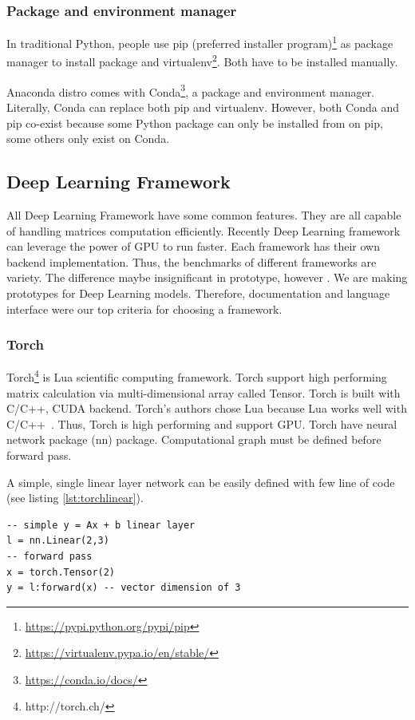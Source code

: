 \subsubsection{Package and environment manager}
In traditional Python, people use pip (preferred installer program)\footnote{\url{https://pypi.python.org/pypi/pip}} as package manager to install package and virtualenv\footnote{\url{https://virtualenv.pypa.io/en/stable/}}. Both have to be installed manually.

Anaconda distro comes with Conda\footnote{\url{https://conda.io/docs/}}, a package and environment manager.
Literally, Conda can replace both pip and virtualenv.
However, both Conda and pip co-exist because some Python package can only be installed from on pip, some others only exist on Conda.


\subsection{Deep Learning Framework}
All Deep Learning Framework have some common features.
They are all capable of handling matrices computation efficiently.
Recently Deep Learning framework can leverage the power of GPU to run faster.
Each framework has their own backend implementation.
Thus, the benchmarks of different frameworks are variety.
The difference maybe insignificant in prototype, however .
We are making prototypes for Deep Learning models.
Therefore, documentation and language interface were our top criteria for choosing a framework.

\subsubsection{Torch}\label{sec:torch}
Torch\footnote{http://torch.ch/} is Lua scientific computing framework.
Torch support high performing matrix calculation via multi-dimensional array called Tensor. Torch is built with C/C++, CUDA backend.
Torch's authors chose Lua because Lua works well with C/C++~\cite{collobert2011torch7}.  Thus, Torch is high performing and support GPU. Torch have neural network package (nn) package. Computational graph must be defined before forward pass.

A simple, single linear layer network can be easily defined with few line of code (see listing \ref{lst:torchlinear}).

\begin{lstlisting}[caption={Simple linear layer in Torch},label={lst:torchlinear}, language={[5.1]Lua}]
-- simple y = Ax + b linear layer
l = nn.Linear(2,3)
-- forward pass
x = torch.Tensor(2)
y = l:forward(x) -- vector dimension of 3
\end{lstlisting}

